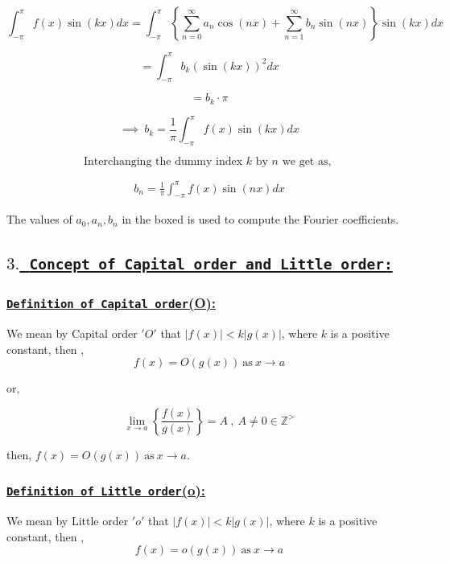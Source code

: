 \documentclass[a4paper,12pt]{article}
\begin{document}
        $$\int_{-\pi}^{\pi}f(x)\sin(kx)dx  = \int_{-\pi}^{\pi}\left\{\sum_{n=0}^{\infty}a_{n}\cos(nx) + \sum_{n=1}^{\infty}b_{n}\sin(nx)\right\}\sin(kx)dx$$

        $$= \int_{-\pi}^{\pi}b_{k}\left(\sin(kx)\right)^2dx$$

        $$= b_{k}\cdot \pi$$

        $$\implies\ b_{k}  =  \frac{1}{\pi}\int_{-\pi}^{\pi}f(x)\sin(kx)dx$$

        $$\mbox{Interchanging the dummy index $k$ by $n$ we get as, }$$

        \begin{align*}
            \boxed{b_{n}  =  \frac{1}{\pi}\int_{-\pi}^{\pi}f(x)\sin(nx)dx}
        \end{align*}

        The values of $a_{0}, a_{n}, b_{n}$ in the boxed is used to compute the Fourier coefficients.

        \pagebreak

        \subsection*{\underline{$3.$\ \texttt{\textbf{Concept of Capital order and Little order:}}}}

        \subsubsection*{\underline{\texttt{\textbf{Definition of Capital order}}(O):}}

        We mean by Capital order $'O'$ that $\left|f(x)\right| < k\left|g(x)\right|$, where $k$ is a positive constant, then ,
        $$f(x) = O(g(x))\ \mbox{as}\ x\to a$$

        or, 

        $$\lim_{x\to a}\left\{\frac{f(x)}{g(x)}\right\} = A\ ,\ A \neq 0 \in \mathbb{Z^> }$$

        then, $f(x) = O(g(x))\ \mbox{as}\ x\to a.$

        \subsubsection*{\underline{\texttt{\textbf{Definition of Little order}}(o):}}

        We mean by Little order $'o'$ that $\left|f(x)\right| < k\left|g(x)\right|$, where $k$ is a positive constant, then ,
        $$f(x) = o(g(x))\ \mbox{as}\ x\to a$$
\end{document}
